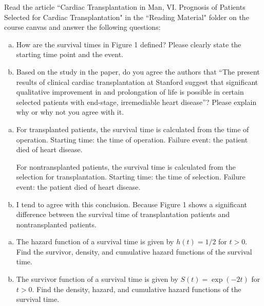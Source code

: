 \documentclass[12pt]{elegantbook}
\begin{document}
    \begin{exercise}
        Read the article “Cardiac Transplantation in Man, VI. Prognosis of Patients Selected for Cardiac Transplantation" in the “Reading Material" folder on the course canvas and answer the following questions: 
        \begin{enumerate}[(a)]
            \item How are the survival times in Figure 1 defined? Please clearly state the starting time point and the event.
            \item Based on the study in the paper, do you agree the authors that “The present results of clinical cardiac transplantation at Stanford suggest that significant qualitative improvement in and prolongation of life is possible in certain selected patients with end-stage, irremediable heart disease”? Please explain why or why not you agree with it. 
        \end{enumerate}
    \end{exercise}

    \begin{solution}
        \begin{enumerate}[(a)]
            \item For transplanted patients, the survival time is calculated from the time of operation. Starting time: the time of operation. Failure event: the patient died of heart disease. 
            
            For nontransplanted patients, the survival time is calculated from the selection for transplantation. Starting time: the time of selection. Failure event: the patient died of heart disease. 
            \item I tend to agree with this conclusion. Because Figure 1 shows a significant difference between the survival time of transplantation patients and nontransplanted patients. 
        \end{enumerate}
    \end{solution}

    \begin{exercise}
        \begin{enumerate}[(a)]
            \item The hazard function of a survival time is given by $h(t) = 1/2$ for $t > 0$. Find the survivor, density, and cumulative hazard functions of the survival time. 
            \item The survivor function of a survival time is given by $S(t) = \exp(-2t)$ for $t > 0$. Find the density, hazard, and cumulative hazard functions of the survival time. 
        \end{enumerate}
    \end{exercise}
\end{document}
